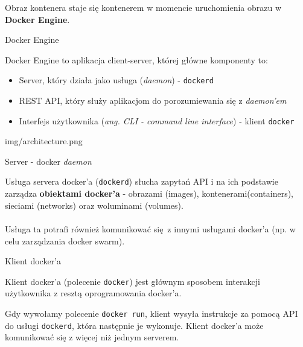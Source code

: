 \documentclass[aspectratio=169]{beamer}
\begin{document}
\begin{frame}
    \begin{multicols}{2}
        \vspace*{47mm}
        \begin{card}
            Obraz kontenera staje się kontenerem w momencie uruchomienia obrazu w \textbf{Docker Engine}.
        \end{card}
    \end{multicols}
\end{frame}

\begin{frame}{Docker Engine}

    \begin{card}
        Docker Engine to aplikacja client-server, której główne komponenty to:
        \begin{itemize}
            \item Server, który działa jako usługa (\textit{daemon}) - \colorbox{dark-gray}{\lstinline{dockerd}}
            \item REST API, który służy aplikacjom do porozumiewania się z \textit{daemon'em}
            \item Interfejs użytkownika (\textit{ang. CLI - command line interface}) - klient \colorbox{dark-gray}{\lstinline{docker}}
        \end{itemize}
    \end{card}
\end{frame}

\begin{frameImg}[50mm]{img/architecture.png}
\end{frameImg}


\begin{frame}{Server - docker \textit{daemon}}
    \begin{card}
        Usługa servera docker'a (\colorbox{dark-gray}{\lstinline{dockerd}}) słucha zapytań API i na ich podstawie zarządza \textbf{obiektami docker'a} - obrazami (images), kontenerami(containers), sieciami (networks) oraz woluminami (volumes).\\\\
        Usługa ta potrafi również komunikować się z innymi usługami docker'a (np. w celu zarządzania docker swarm).
    \end{card}
\end{frame}

\begin{frame}{Klient docker'a}
    \begin{card}
        Klient docker'a (polecenie \colorbox{dark-gray}{\lstinline{docker}}) jest głównym sposobem interakcji użytkownika z resztą oprogramowania docker'a.
    \end{card}
    \begin{card}
        Gdy wywołamy polecenie \colorbox{dark-gray}{\lstinline{docker run}}, klient wysyła instrukcje za pomocą API do usługi  \colorbox{dark-gray}{\lstinline{dockerd}}, która następnie je wykonuje. Klient docker'a może komunikować się z więcej niż jednym serverem.

    \end{card}
\end{frame}
\end{document}
